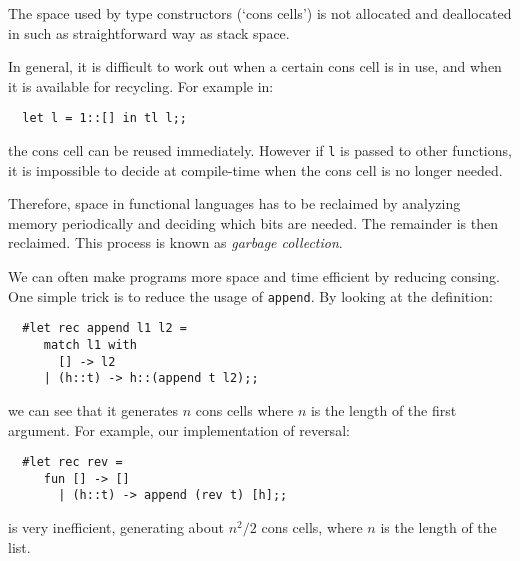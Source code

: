 \begin{slide*}


\vspace*{0.5cm}

The space used by type constructors (`cons cells') is not allocated and
deallocated in such as straightforward way as stack space.

In general, it is difficult to work out when a certain cons cell is in use, and
when it is available for recycling. For example in:

\begin{black}\begin{verbatim}
  let l = 1::[] in tl l;;
\end{verbatim}\end{black}

\noindent the cons cell can be reused immediately. However if {\black \tt l} is
passed to other functions, it is impossible to decide at compile-time when the
cons cell is no longer needed.

Therefore, space in functional languages has to be reclaimed by analyzing
memory periodically and deciding which bits are needed. The remainder is then
reclaimed. This process is known as {\em garbage collection}.

\end{slide*}

\begin{slide*}


\vspace*{0.5cm}

We can often make programs more space and time efficient by reducing consing.
One simple trick is to reduce the usage of {\black \tt append}. By looking at
the definition:

\begin{black}\begin{verbatim}
  #let rec append l1 l2 =
     match l1 with
       [] -> l2
     | (h::t) -> h::(append t l2);;
\end{verbatim}\end{black}

we can see that it generates {\red $n$} cons cells where {\red $n$} is the
length of the first argument. For example, our implementation of reversal:

\begin{black}\begin{verbatim}
  #let rec rev =
     fun [] -> []
       | (h::t) -> append (rev t) [h];;
\end{verbatim}\end{black}

is very inefficient, generating about {\red $n^2 / 2$} cons cells, where {\red
$n$} is the length of the list.

\end{slide*}





